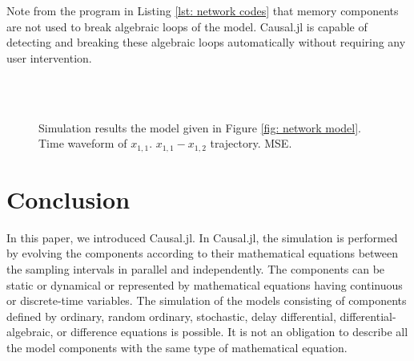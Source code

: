 \documentclass{juliacon}
\begin{document}
{Note from the program in Listing \ref{lst: network codes} that memory components are not used to break algebraic loops of the model. Causal.jl is capable of detecting and breaking these algebraic loops automatically without requiring any user intervention. 

\begin{figure}
    \centering
    \\[-0.1cm]
     \\[-0.1cm]
    \caption{Simulation results the model given in Figure \ref{fig: network model}. \protect{} Time waveform of $x_{1,1}$. \protect{} $x_{1,1} - x_{1,2}$ trajectory. \protect{} MSE.}
    \label{fig: network simulation results}
\end{figure}

\section{Conclusion}
In this paper, we introduced Causal.jl. In Causal.jl, the simulation is performed by evolving the components according to their mathematical equations between the sampling intervals in parallel and independently. The components can be static or dynamical or represented by mathematical equations having continuous or discrete-time variables. The simulation of the models consisting of components defined by ordinary, random ordinary, stochastic, delay differential, differential-algebraic, or difference equations is possible. It is not an obligation to describe all the model components with the same type of mathematical equation.

}
\end{document}
